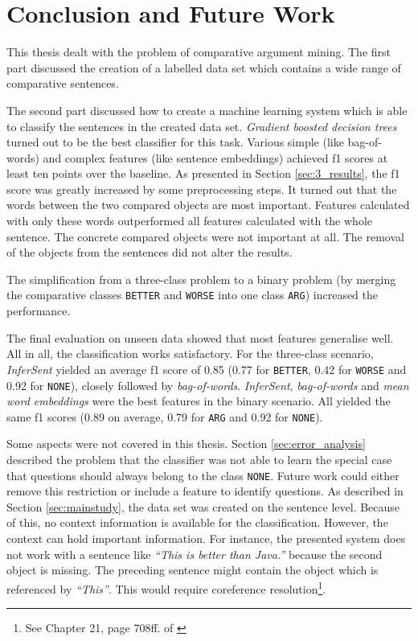 \chapter{Conclusion and Future Work}
This thesis dealt with the problem of comparative argument mining. The first part discussed the creation of a labelled data set which contains a wide range of comparative sentences.

The second part discussed how to create a machine learning system which is able to classify the sentences in the created data set. \emph{Gradient boosted decision trees} turned out to be the best classifier for this task. Various simple (like bag-of-words) and complex features (like sentence embeddings) achieved f1 scores at least ten points over the baseline. As presented in Section \ref{sec:3_results}, the f1 score was greatly increased by some preprocessing steps. It turned out that the words between the two compared objects are most important. Features calculated with only these words outperformed all features calculated with the whole sentence. The concrete compared objects were not important at all. The removal of the objects from the sentences did not alter the results.

The simplification from a three-class problem to a binary problem (by merging the comparative classes \texttt{BETTER} and \texttt{WORSE} into one class \texttt{ARG}) increased the performance.

The final evaluation on unseen data showed that most features generalise well. All in all, the classification works satisfactory. For the three-class scenario, \emph{InferSent}  yielded an average f1 score of 0.85 (0.77 for \texttt{BETTER}, 0.42 for \texttt{WORSE} and 0.92 for \texttt{NONE}), closely followed by \emph{bag-of-words}. \emph{InferSent}, \emph{bag-of-words} and \emph{mean word embeddings} were the best features in the binary scenario. All yielded the same f1 scores (0.89 on average, 0.79 for \texttt{ARG} and 0.92 for \texttt{NONE}).
\newline


Some aspects were not covered in this thesis. Section \ref{sec:error_analysis} described the problem that the classifier was not able to learn the special case that questions should always belong to the class \texttt{NONE}. Future work could either remove this restriction or include a feature to identify questions. As described in Section \ref{sec:mainstudy}, the data set was created on the sentence level. Because of this, no context information is available for the classification. However, the context can hold important information. For instance, the presented system does not work with a sentence like \emph{\enquote{This is better than Java.}} because the second object is missing. The preceding sentence might contain the object which is referenced by \emph{\enquote{This}}. This would require coreference resolution\footnote{See Chapter 21, page 708ff. of \cite{martin2009speech}}.

